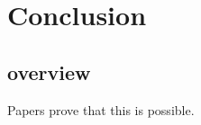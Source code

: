 

\section{Conclusion}
\lipsum[1-2]

\subsection{overview}
\lipsum[3-7]

Papers prove
\parencite{5:mvcp, 55:mvcp, 555:mvcp}
that this is possible. \lipsum[1-1]
